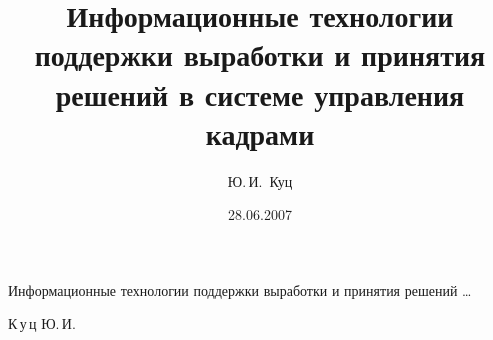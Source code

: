 %





%












\renewcommand{\firstpage}{189} %

\renewcommand{\lastpage}{191} %
















\title{Информационные технологии поддержки выработки и принятия решений в системе управления кадрами}

      {Информационные технологии поддержки выработки и принятия решений \dots}


\author{Ю.\,И.~Куц}

       {К\,у\,ц Ю.\,И.}






\date{28.06.2007}





\address{Военно-Морской Институт Радиоэлектроники им. А.\,С.~Попова, \\ г. Санкт-Петербург, Петродворец}






